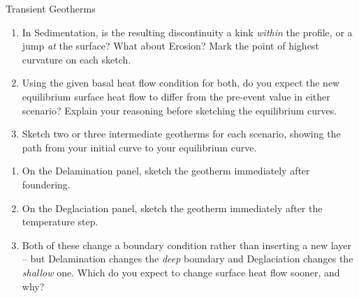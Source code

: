 \begin{activity}{Transient Geotherms}
\begin{questions}[resume]
\begin{enumerate}[label=(\alph*)]
    \item In Sedimentation, is the resulting discontinuity a kink \emph{within} the profile, or a jump \emph{at} the surface? What about Erosion? Mark the point of highest curvature on each sketch.
    \answerbox[2.5cm]

    \item Using the given basal heat flow condition for both, do you expect the new equilibrium surface heat flow to differ from the pre-event value in either scenario? Explain your reasoning before sketching the equilibrium curves.
    \answerbox[2.5cm]

    \item Sketch two or three intermediate geotherms for each scenario, showing the path from your initial curve to your equilibrium curve.
    \answerbox[2cm]
  \end{enumerate}
\end{questions}

\begin{minipage}{0.48\textwidth}
\end{minipage}
\hfill
\begin{minipage}{0.48\textwidth}
\end{minipage}


\begin{questions}[resume]
  \begin{enumerate}[label=(\alph*)]
    \item On the Delamination panel, sketch the geotherm immediately after foundering.
    \answerbox[1.5cm]

    \item On the Deglaciation panel, sketch the geotherm immediately after the temperature step.
    \answerbox[1.5cm]

    \item Both of these change a boundary condition rather than inserting a new layer -- but Delamination changes the \emph{deep} boundary and Deglaciation changes the \emph{shallow} one. Which do you expect to change surface heat flow sooner, and why?
    \answerbox[2.5cm]


\end{enumerate}
\end{questions}
\end{activity}
